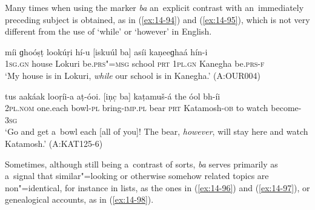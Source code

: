 Many times when using the marker \textit{ba} an~explicit contrast with an~immediately preceding subject is obtained, as in (\ref{ex:14-94}) and (\ref{ex:14-95}), which is not very different from the use of `while' or `however' in English.

\begin{exe}
\ex
\label{ex:14-94}
\gll míi ɡhoóṣṭ lookúṛi hí-u [iskuúl ba] asíi  kaṇeeɡhaá hín-i \\
\textsc{1sg.gn} house Lokuri be.\textsc{prs"=msg} school \textsc{prt} \textsc{1pl.gn} Kanegha be.\textsc{prs-f } \\
\glt `My house is in Lokuri, \textit{while} our school is in Kanegha.' (A:OUR004)

\ex
\label{ex:14-95}
\gll tus aakáak looṛíi-a aṭ-óoi. [iṇc̣ ba]  kaṭamuš-á the óol bh-íi \\
\textsc{2pl.nom} one.each bowl-\textsc{pl} bring-\textsc{imp.pl} bear \textsc{prt}  Katamosh-\textsc{ob} to watch become-\textsc{3sg } \\
\glt `Go and get a~bowl each [all of you]! The bear, \textit{however}, will stay here and watch Katamosh.' (A:KAT125-6)
\end{exe}

Sometimes, although still being a~contrast of sorts, \textit{ba} serves primarily as a~signal that similar"=looking or otherwise somehow related topics are non"=identical, for instance in lists, as the ones in (\ref{ex:14-96}) and (\ref{ex:14-97}), or genealogical accounts, as in (\ref{ex:14-98}). 

